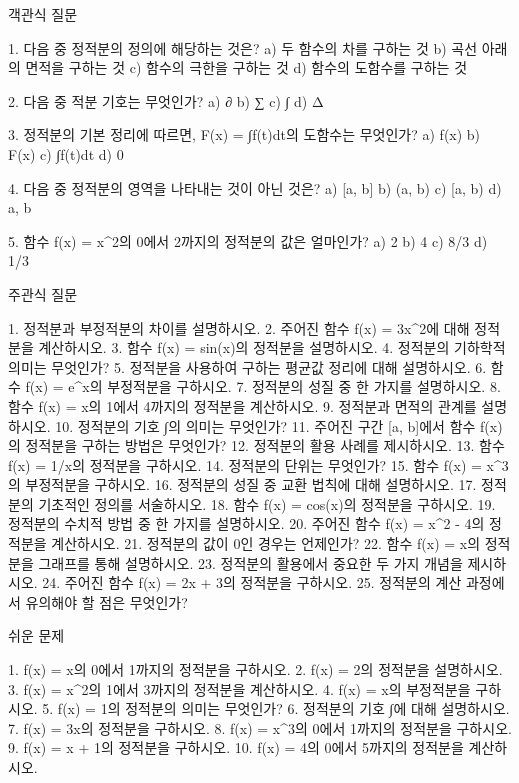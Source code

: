 \documentclass[fleqn]{article}
\begin{document}
      
         객관식 질문

1. 다음 중 정적분의 정의에 해당하는 것은?  
   a) 두 함수의 차를 구하는 것  
   b) 곡선 아래의 면적을 구하는 것  
   c) 함수의 극한을 구하는 것  
   d) 함수의 도함수를 구하는 것  

2. 다음 중 적분 기호는 무엇인가?  
   a) ∂  
   b) ∑  
   c) ∫  
   d) Δ  

3. 정적분의 기본 정리에 따르면, F(x) = ∫f(t)dt의 도함수는 무엇인가?  
   a) f(x)  
   b) F(x)  
   c) ∫f(t)dt  
   d) 0  

4. 다음 중 정적분의 영역을 나타내는 것이 아닌 것은?  
   a) [a, b]  
   b) (a, b)  
   c) [a, b)  
   d) {a, b}  

5. 함수 f(x) = x^2의 0에서 2까지의 정적분의 값은 얼마인가?  
   a) 2  
   b) 4  
   c) 8/3  
   d) 1/3  

 주관식 질문

1. 정적분과 부정적분의 차이를 설명하시오.  
2. 주어진 함수 f(x) = 3x^2에 대해 정적분을 계산하시오.  
3. 함수 f(x) = sin(x)의 정적분을 설명하시오.  
4. 정적분의 기하학적 의미는 무엇인가?  
5. 정적분을 사용하여 구하는 평균값 정리에 대해 설명하시오.  
6. 함수 f(x) = e^x의 부정적분을 구하시오.  
7. 정적분의 성질 중 한 가지를 설명하시오.  
8. 함수 f(x) = x의 1에서 4까지의 정적분을 계산하시오.  
9. 정적분과 면적의 관계를 설명하시오.  
10. 정적분의 기호 ∫의 의미는 무엇인가?  
11. 주어진 구간 [a, b]에서 함수 f(x)의 정적분을 구하는 방법은 무엇인가?  
12. 정적분의 활용 사례를 제시하시오.  
13. 함수 f(x) = 1/x의 정적분을 구하시오.  
14. 정적분의 단위는 무엇인가?  
15. 함수 f(x) = x^3의 부정적분을 구하시오.  
16. 정적분의 성질 중 교환 법칙에 대해 설명하시오.  
17. 정적분의 기초적인 정의를 서술하시오.  
18. 함수 f(x) = cos(x)의 정적분을 구하시오.  
19. 정적분의 수치적 방법 중 한 가지를 설명하시오.  
20. 주어진 함수 f(x) = x^2 - 4의 정적분을 계산하시오.  
21. 정적분의 값이 0인 경우는 언제인가?  
22. 함수 f(x) = x의 정적분을 그래프를 통해 설명하시오.  
23. 정적분의 활용에서 중요한 두 가지 개념을 제시하시오.  
24. 주어진 함수 f(x) = 2x + 3의 정적분을 구하시오.  
25. 정적분의 계산 과정에서 유의해야 할 점은 무엇인가?  

 쉬운 문제

1. f(x) = x의 0에서 1까지의 정적분을 구하시오.  
2. f(x) = 2의 정적분을 설명하시오.  
3. f(x) = x^2의 1에서 3까지의 정적분을 계산하시오.  
4. f(x) = x의 부정적분을 구하시오.  
5. f(x) = 1의 정적분의 의미는 무엇인가?  
6. 정적분의 기호 ∫에 대해 설명하시오.  
7. f(x) = 3x의 정적분을 구하시오.  
8. f(x) = x^3의 0에서 1까지의 정적분을 구하시오.  
9. f(x) = x + 1의 정적분을 구하시오.  
10. f(x) = 4의 0에서 5까지의 정적분을 계산하시오.  
\end{document}
